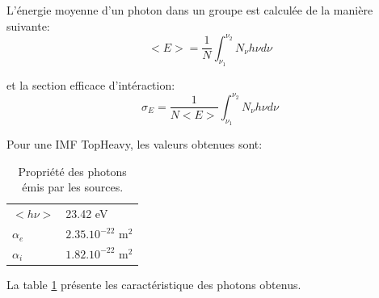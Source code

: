 L’énergie moyenne d'un photon dans un groupe est calculée de la manière suivante:
\begin{equation}
<E> = \frac{1}{N} \int_{\nu_1}^{\nu_2} N_\nu h \nu d\nu
\end{equation}

et la section efficace d'intéraction:
\begin{equation}
\sigma_E = \frac{1}{N<E>} \int_{\nu_1}^{\nu_2} N_\nu h \nu d\nu
\end{equation}

Pour une IMF TopHeavy, les valeurs obtenues sont:


\begin{table}
\begin{tabular}{l l }
	$<h\nu>$	&  23.42 eV \\
	$\alpha_e$	&  $2.35.10^{-22}$ m$^2$ \\
	$\alpha_i$	&  $1.82.10^{-22}$ m$^2$ \\
\end{tabular}
\caption{Propriété des photons émis par les sources.
\label{tab_photon}}
\end{table}

La table \ref{tab_photon} présente les caractéristique des photons obtenus.






%


